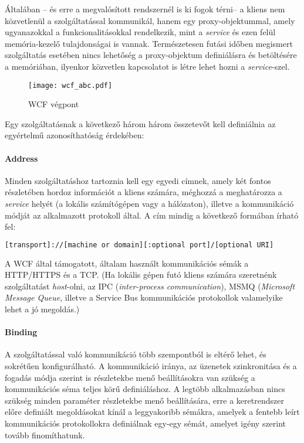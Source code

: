Általában -- és erre a megvalósított rendszernél is ki fogok térni-- a kliens nem közvetlenül a szolgáltatással kommunikál, hanem egy proxy-objektummal, amely ugyanazokkal a funkcionalitásokkal rendelkezik, mint a \emph{service} és ezen felül memória-kezelő tulajdonságai is vannak. Természetesen futási időben megismert szolgáltatás esetében nincs lehetőség a proxy-objektum definiálásra és betöltésére a memóriában, ilyenkor közvetlen kapcsolatot is létre lehet hozni a \emph{service}-szel. \cite{wcf-programming}
\begin{figure}[h]
\vspace{.5cm}
\texttt{[image: wcf\_abc.pdf]}
\centering
\vspace{.2cm}
\caption{WCF végpont}
\vspace{.5cm}
\label{fig:wcf_abc}
\end{figure}

Egy szolgáltatásnak a következő három három összetevőt kell definiálnia az egyértelmű azonosíthatóság érdekében:
\paragraph{Address} Minden szolgáltatáshoz tartoznia kell egy egyedi címnek, amely két fontos részletében hordoz információt a kliens számára, méghozzá a meghatározza a \emph{service} helyét (a lokális számítógépen vagy a hálózaton), illetve a kommunikáció módját az alkalmazott protokoll által. A cím mindig a következő formában írható fel:

\begin{mdframed}[backgroundcolor=gray!20]
\begin{scriptsize}
\begin{lstlisting}[language=bash]
[transport]://[machine or domain][:optional port]/[optional URI]
\end{lstlisting}
\end{scriptsize}
\end{mdframed}

A WCF által támogatott, általam használt kommunikációs sémák a HTTP/HTTPS és a TCP. (Ha lokális gépen futó kliens számára szeretnénk szolgáltatást \emph{host}-olni, az IPC (\emph{inter-process communication}), MSMQ (\emph{Microsoft Message Queue}, illetve a Service Bus kommunikációs protokollok valamelyike lehet a jó megoldás.)
\paragraph{Binding} A szolgáltatással való kommunikáció több szempontból is eltérő lehet, és sokrétűen konfigurálható. A kommunikáció iránya, az üzenetek szinkronitása és a fogadás módja szerint is részletekbe menő beállításokra van szükség a kommunikációs séma teljes körű definiáláshoz. A legtöbb alkalmazásban nincs szükség minden paraméter részletekbe menő beállítására, erre a keretrendszer előre definiált megoldásokat kínál a leggyakoribb sémákra, amelyek a fentebb leírt kommunikációs protokollokra definiálnak egy-egy sémát, amelyet igény szerint tovább finomíthatunk.
